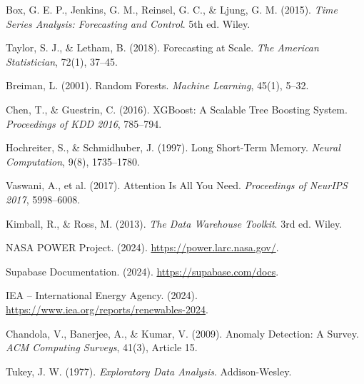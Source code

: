 \documentclass[12pt, a4paper]{report}
\begin{document}
\begin{enumerate}[label={[\arabic*]}, noitemsep]
    \item Box, G. E. P., Jenkins, G. M., Reinsel, G. C., \& Ljung, G. M. (2015). \textit{Time Series Analysis: Forecasting and Control}. 5th ed. Wiley.
    \item Taylor, S. J., \& Letham, B. (2018). Forecasting at Scale. \textit{The American Statistician}, 72(1), 37--45.
    \item Breiman, L. (2001). Random Forests. \textit{Machine Learning}, 45(1), 5--32.
    \item Chen, T., \& Guestrin, C. (2016). XGBoost: A Scalable Tree Boosting System. \textit{Proceedings of KDD 2016}, 785--794.
    \item Hochreiter, S., \& Schmidhuber, J. (1997). Long Short-Term Memory. \textit{Neural Computation}, 9(8), 1735--1780.
    \item Vaswani, A., et al. (2017). Attention Is All You Need. \textit{Proceedings of NeurIPS 2017}, 5998--6008.
    \item Kimball, R., \& Ross, M. (2013). \textit{The Data Warehouse Toolkit}. 3rd ed. Wiley.
    \item NASA POWER Project. (2024). \url{https://power.larc.nasa.gov/}.
    \item Supabase Documentation. (2024). \url{https://supabase.com/docs}.
    \item IEA -- International Energy Agency. (2024). \url{https://www.iea.org/reports/renewables-2024}.
    \item Chandola, V., Banerjee, A., \& Kumar, V. (2009). Anomaly Detection: A Survey. \textit{ACM Computing Surveys}, 41(3), Article 15.
    \item Tukey, J. W. (1977). \textit{Exploratory Data Analysis}. Addison-Wesley.
\end{enumerate}
\end{document}
